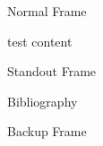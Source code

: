 \documentclass{beamer}
\begin{document}
\begin{frame}
    \maketitle
\end{frame}




\begin{frame}{Normal Frame}
    \begin{block}{test}
        content
    \end{block}
\end{frame}

\begin{frame}[standout]
    Standout Frame
\end{frame}


\begin{frame}[allowframebreaks]{Bibliography}
    \printbibliography[heading=none]
\end{frame}

\appendix

\begin{frame}{Backup Frame}
\end{frame}
\end{document}
